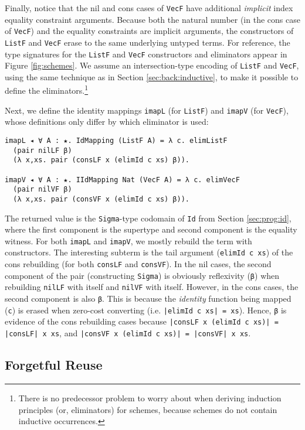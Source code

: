 \documentclass[acmsmall]{acmart}\settopmatter{}
\newcommand{\refsec}[1]{Section \ref{sec:#1}}
\newcommand{\labsec}[1]{\label{sec:#1}}
\newcommand{\reffig}[1]{Figure \ref{fig:#1}}
\begin{document}
Finally, notice that the nil and cons cases of \verb;VecF; have
additional \textit{implicit} index equality constraint
arguments. Because both the natural number (in the cons case of
\verb;VecF;) and the equality constraints are implicit arguments, the
constructors of \verb;ListF; and \verb;VecF; erase to the same
underlying untyped terms. For reference, the type signatures for the
\verb;ListF; and \verb;VecF; constructors and eliminators appear in
\reffig{schemes}. We assume an intersection-type encoding of
\verb;ListF; and \verb;VecF;, using the same technique as in
\refsec{back:inductive}, to make it possible to define the
eliminators.\footnote{
  There is no predecessor problem to worry about when deriving
  induction principles (or, eliminators) for schemes, because schemes
  do not contain inductive occurrences.
}

Next, we define the identity mappings \verb;imapL; (for \verb;ListF;)
and \verb;imapV; (for \verb;VecF;), whose definitions only differ by
which eliminator is used:

\begin{verbatim}
imapL ◂ ∀ A : ★. IdMapping (ListF A) = λ c. elimListF
  (pair nilLF β)
  (λ x,xs. pair (consLF x (elimId c xs) β)).

imapV ◂ ∀ A : ★. IIdMapping Nat (VecF A) = λ c. elimVecF
  (pair nilVF β)
  (λ x,xs. pair (consVF x (elimId c xs) β)).
\end{verbatim}
The returned value is the \verb;Sigma;-type codomain of \verb;Id; from
\refsec{prog:id}, where the first component is the supertype and
second component is the equality witness. For both \verb;imapL; and
\verb;imapV;, we mostly rebuild the term with constructors. The
interesting subterm is the tail argument (\verb;elimId c xs;) of the
cons rebuilding (for both \verb;consLF; and \verb;consVF;).
In the nil cases, the second component of the pair (constructing
\verb;Sigma;) is obviously reflexivity (\verb;β;) when rebuilding
\verb;nilLF; with itself and \verb;nilVF; with itself. However, in the
cons cases, the second component is also \verb;β;. This is because the
\textit{identity} function being mapped (\verb;c;) is erased when
zero-cost converting (i.e. \verb;|elimId c xs| = xs;).
Hence, \verb;β; is evidence of the
cons rebuilding cases because \verb;|consLF x (elimId c xs)| = |consLF| x xs;,
and \verb;|consVF x (elimId c xs)| = |consVF| x xs;.

\subsection{Forgetful Reuse}
\labsec{data:fog}
\end{document}
